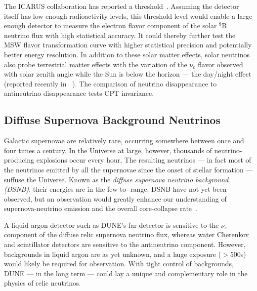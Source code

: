 The ICARUS collaboration has reported a 
threshold~\cite{Guglielmi:2012}. Assuming the detector itself
has low enough radioactivity levels, this threshold level would enable
a large enough detector to measure the electron flavor component of
the solar $^8$B neutrino flux with high statistical accuracy. It could 
thereby further test the MSW flavor transformation curve with higher statistical precision and
potentially better energy resolution. 
In addition to these solar
matter effects, solar 
neutrinos also probe terrestrial matter effects
with the variation of the $\nu_e$ flavor observed with solar zenith
angle while the Sun is below the horizon --- the day/night effect (reported recently in ~\cite{Renshaw:2013dzu}). 
The comparison
of neutrino disappearance to antineutrino disappearance tests CPT
invariance. 


\subsection{Diffuse Supernova Background Neutrinos}

Galactic supernovae are relatively rare, occurring somewhere between
once and four times a century. In the Universe
at large, however, thousands of neutrino-producing explosions occur
every hour.  The resulting neutrinos --- in fact most of the neutrinos
emitted by all the supernovae since the onset of stellar formation ---
suffuse the Universe.  Known as the \emph{diffuse supernova neutrino background
  (DSNB)}, their energies are in the few-to- range.  DSNB
have not yet been observed, but an observation would greatly enhance
our understanding of supernova-neutrino emission and the overall
core-collapse rate~\cite{Beacom:2010kk}.


A liquid argon detector such as DUNE's far detector is sensitive to
the $\nu_e$ component of the diffuse relic supernova neutrino flux,
whereas water Cherenkov and scintillator detectors are sensitive to
the antineutrino component.  However, backgrounds in liquid argon are as
yet unknown, and a huge exposure ($>$\SI{500}{\ktyr}s)
would likely be required for observation.  
With tight control of
backgrounds, 
DUNE --- in the long term --- could 
lay a unique and
 complementary role in the physics of relic neutrinos.


